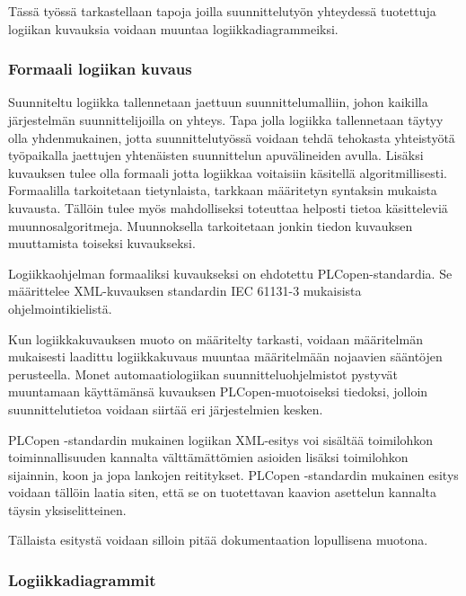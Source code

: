 \documentclass[finnish,12pt]{article}
\begin{document}
Tässä työssä tarkastellaan tapoja joilla suunnittelutyön yhteydessä tuotettuja logiikan kuvauksia voidaan muuntaa logiikkadiagrammeiksi.

		\subsubsection{Formaali logiikan kuvaus}

Suunniteltu logiikka tallennetaan jaettuun suunnittelumalliin, johon kaikilla järjestelmän suunnittelijoilla on yhteys.
Tapa jolla logiikka tallennetaan täytyy olla yhdenmukainen, jotta suunnittelutyössä voidaan tehdä tehokasta yhteistyötä työpaikalla jaettujen yhtenäisten suunnittelun apuvälineiden avulla.
Lisäksi kuvauksen tulee olla formaali jotta logiikkaa voitaisiin käsitellä algoritmillisesti.
Formaalilla tarkoitetaan tietynlaista, tarkkaan määritetyn syntaksin mukaista kuvausta.
Tällöin tulee myös mahdolliseksi toteuttaa helposti tietoa käsitteleviä muunnosalgoritmeja.
Muunnoksella tarkoitetaan jonkin tiedon kuvauksen muuttamista toiseksi kuvaukseksi.

Logiikkaohjelman formaaliksi kuvaukseksi on ehdotettu PLCopen-standardia.
Se määrittelee XML-kuvauksen standardin IEC 61131-3 mukaisista ohjelmointikielistä.

Kun logiikkakuvauksen muoto on määritelty tarkasti, voidaan määritelmän mukaisesti laadittu logiikkakuvaus muuntaa määritelmään nojaavien sääntöjen perusteella.
Monet automaatiologiikan suunnitteluohjelmistot pystyvät muuntamaan käyttämänsä kuvauksen PLCopen-muotoiseksi tiedoksi, jolloin suunnittelutietoa voidaan siirtää eri järjestelmien kesken.

PLCopen -standardin mukainen logiikan XML-esitys voi sisältää toimilohkon toiminnallisuuden kannalta välttämättömien asioiden lisäksi toimilohkon sijainnin, koon ja jopa lankojen reititykset.
PLCopen -standardin mukainen esitys voidaan tällöin laatia siten, että se on tuotettavan kaavion asettelun kannalta täysin yksiselitteinen.

Tällaista esitystä voidaan silloin pitää dokumentaation lopullisena muotona.

	\subsubsection{Logiikkadiagrammit}
\end{document}
